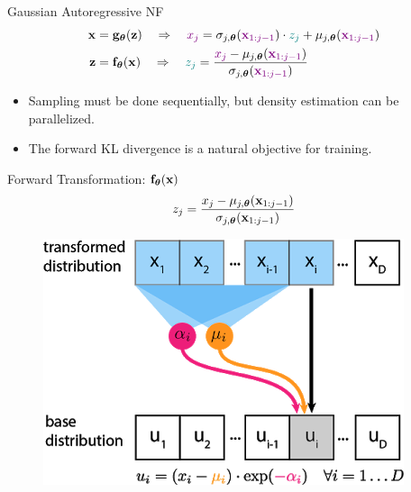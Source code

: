 \documentclass{beamer}
\begin{document}
\begin{frame}{Gaussian Autoregressive NF}
	\vspace{-0.5cm}
	\begin{align*}
		\mathbf{x} &= \mathbf{g}_{\boldsymbol{\theta}}(\mathbf{z}) \quad \Rightarrow \quad {\color{violet} x_j} = \sigma_{j, \boldsymbol{\theta}} ({\color{violet} \mathbf{x}_{1:j-1}}) \cdot {\color{teal} z_j} + \mu_{j, \boldsymbol{\theta}}({\color{violet} \mathbf{x}_{1:j-1}}) \\
		\mathbf{z} &= \mathbf{f}_{\boldsymbol{\theta}}(\mathbf{x}) \quad \Rightarrow \quad {\color{teal} z_j} = \frac{{\color{violet}x_j} - \mu_{j, \boldsymbol{\theta}}({\color{violet}\mathbf{x}_{1:j-1}})}{\sigma_{j, \boldsymbol{\theta}} ({\color{violet}\mathbf{x}_{1:j-1}})}
	\end{align*}
	\vspace{-0.5cm}
	\eqpause
	\begin{itemize}
		\item Sampling must be done sequentially, but density estimation can be parallelized.
		\item The forward KL divergence is a natural objective for training.
	\end{itemize}
	\vspace{-0.3cm}
	\eqpause
	\begin{minipage}[t]{0.65\columnwidth}
		\begin{block}{Forward Transformation: $\mathbf{f}_{\boldsymbol{\theta}}(\mathbf{x})$}
			\[
				z_j = \frac{x_j - \mu_{j, \boldsymbol{\theta}}(\mathbf{x}_{1:j-1})}{\sigma_{j, \boldsymbol{\theta}} (\mathbf{x}_{1:j-1}) }
			\]
			\vspace{-0.4cm}
		\end{block}
	\end{minipage}%
	\begin{minipage}[t]{0.35\columnwidth}
		\begin{figure}[h]
			\centering
			\includegraphics[width=.9\linewidth]{figs/af_iaf_explained_2.png}

\end{figure}
\end{minipage}
\end{frame}
\end{document}
